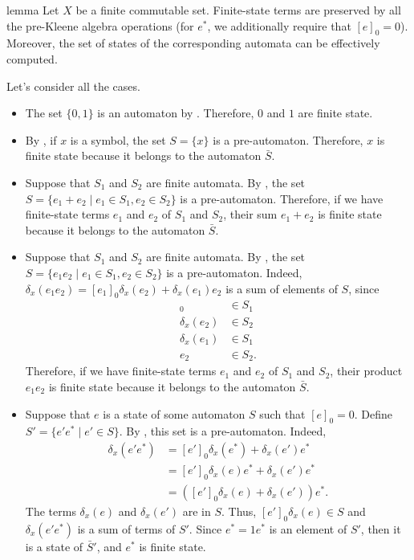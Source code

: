 \documentclass[11pt,a4paper]{amsart}
\theoremstyle{definition}
\begin{document}
\begin{theoremEnd}{lemma}
  \label{lem:finite-state-closure}
  Let $X$ be a finite commutable set. Finite-state terms are preserved by all
  the pre-Kleene algebra operations (for $e^*$, we additionally require that
  $[e]_0 = 0$).  Moreover, the set of states of the corresponding automata can
  be effectively computed.
\end{theoremEnd}

\begin{proofEnd} %
  Let's consider all the cases.
  \begin{itemize}
  \item The set $\{0,1\}$ is an automaton by .
    Therefore, $0$ and $1$ are finite state.
  \item By , if $x$ is a symbol, the set $S = \{x\}$
    is a pre-automaton.  Therefore, $x$ is finite state because it belongs to
    the automaton $\bar{S}$.
  \item Suppose that $S_1$ and $S_2$ are finite automata.  By
    , the set
    $S = \{e_1 + e_2  \mid  e_1  \in  S_1, e_2  \in  S_2\}$ is a pre-automaton.  Therefore,
    if we have finite-state terms $e_1$ and $e_2$ of $S_1$ and $S_2$, their sum
    $e_1+e_2$ is finite state because it belongs to the automaton $\bar{S}$.
  \item Suppose that $S_1$ and $S_2$ are finite automata.  By
    , the set
    $S = \{e_1e_2 \mid  e_1  \in  S_1, e_2  \in  S_2\}$ is a pre-automaton.  Indeed,
    $ \delta _x(e_1e_2) = [e_1]_0 \delta _x(e_2) +  \delta _x(e_1)e_2$ is a sum of elements of $S$,
    since
    \begin{align*}
      [e_1]_0 &  \in  S_1 \\
       \delta _x(e_2) &  \in  S_2 \\
       \delta _x(e_1) &  \in  S_1 \\
      e_2 &  \in  S_2.
    \end{align*}
    Therefore, if we have finite-state terms $e_1$ and $e_2$ of $S_1$ and $S_2$,
    their product $e_1e_2$ is finite state because it belongs to the automaton
    $\bar{S}$.
  \item Suppose that $e$ is a state of some automaton $S$ such that $[e]_0 = 0$.
    Define $S' = \{ e'e^*  \mid  e'  \in  S \}$.  By , this
    set is a pre-automaton.  Indeed,
    \begin{align*}
       \delta _x(e'e^*)
      & = [e']_0 \delta _x(e^*) +  \delta _x(e')e^* \\
      & = [e']_0 \delta _x(e)e^* +  \delta _x(e')e^* \\
      & = ([e']_0 \delta _x(e)+ \delta _x(e'))e^*.
    \end{align*}
    The terms $ \delta _x(e)$ and $ \delta _x(e')$ are in $S$. Thus, $[e']_0 \delta _x(e)  \in  S$ and
    $ \delta _x(e'e^*)$ is a sum of terms of $S'$.  Since $e^* = 1e^*$ is an element of
    $S'$, then it is a state of $\bar{S}'$, and $e^*$ is finite state. \qedhere
  \end{itemize}
\end{proofEnd}
\end{document}
